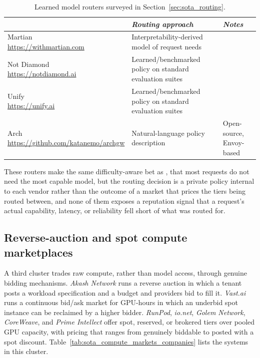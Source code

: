 \begin{samepage}
  \begin{table}[H]
    \centering
    \footnotesize
    \begin{tabular}{l|p{3.4cm}|p{3.1cm}|}
                    & \emph{Routing approach} & \emph{Notes} \\
      \hline
      \makecell[l]{Martian \\ {\scriptsize\url{https://withmartian.com}}}
        & Interpretability-derived model of request needs & \\
      \hline
      \makecell[l]{Not Diamond \\ {\scriptsize\url{https://notdiamond.ai}}}
        & Learned/benchmarked policy on standard evaluation suites & \\
      \hline
      \makecell[l]{Unify \\ {\scriptsize\url{https://unify.ai}}}
        & Learned/benchmarked policy on standard evaluation suites & \\
      \hline
      \makecell[l]{Arch \\ {\scriptsize\url{https://github.com/katanemo/archgw}}}
        & Natural-language policy description & Open-source, Envoy-based \\
      \hline
    \end{tabular}
    \caption{Learned model routers surveyed in Section~\ref{sec:sota_routing}.}
    \label{tab:sota_routing_companies}
  \end{table}
\end{samepage}

These routers make the same difficulty-aware bet as \NoesisServer, that most
requests do not need the most capable model, but the routing decision is a
private policy internal to each vendor rather than the outcome of a market
that prices the tiers being routed between, and none of them exposes a
reputation signal that a request's actual capability, latency, or
reliability fell short of what was routed for.

\subsection{Reverse-auction and spot compute marketplaces}
\label{sec:sota_compute_markets}

A third cluster trades raw compute, rather than model access, through
genuine bidding mechanisms. \emph{Akash Network} runs a reverse auction in
which a tenant posts a workload specification and a budget and providers
bid to fill it. \emph{Vast.ai} runs a continuous bid/ask market for
GPU-hours in which an underbid spot instance can be reclaimed by a higher
bidder. \emph{RunPod}, \emph{io.net}, \emph{Golem Network},
\emph{CoreWeave}, and \emph{Prime Intellect} offer spot, reserved, or
brokered tiers over pooled GPU capacity, with pricing that ranges from
genuinely biddable to posted with a spot discount.
Table~\ref{tab:sota_compute_markets_companies} lists the systems in this
cluster.


